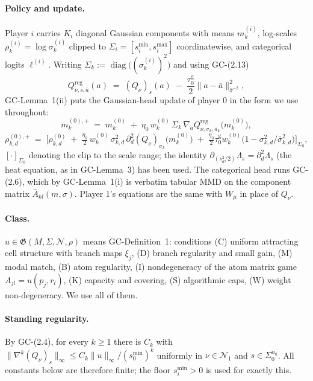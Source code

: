 \documentclass[11pt]{article}
\theoremstyle{definition}
\newcommand{\cN}{\mathcal{N}}
\DeclareMathOperator{\diag}{diag}
\newcommand{\GC}[1]{\textsf{GC-#1}}
\begin{document}
\paragraph{Policy and update.} Player $i$ carries $K_i$ diagonal Gaussian
components with means $m^{(i)}_k$, log-scales $\rho^{(i)}_k = \log\sigma^{(i)}_k$
clipped to $\Sigma_i = [s^{\min}_i, s^{\max}_i]$ coordinatewise, and categorical
logits $\ell^{(i)}$. Writing $\Sigma_k := \diag\big((\sigma^{(i)}_k)^2\big)$ and
using \GC{(2.13)}
\begin{equation}\label{eq:Qreg}
  Q^{\mathrm{reg}}_{\nu,s,\bar a}(a) \;=\; (Q_\nu)_s(a)
  \;-\; \frac{\tau^{\mathrm g}_0}{2}\|a - \bar a\|^2_{\bar\sigma^{-2}},
\end{equation}
\GC{Lemma~1}(ii) puts the Gaussian-head update of player $0$ in the form we use
throughout:
\begin{equation}\label{eq:meanupd}
  m^{(0),+}_k \;=\; m^{(0)}_k \;+\; \eta_0\, w^{(0)}_k\, \Sigma_k\,
  \nabla_a Q^{\mathrm{reg}}_{\nu,\sigma_k,\bar a_k}\big(m^{(0)}_k\big),
\end{equation}
\begin{equation}\label{eq:scaleupd}
  \rho^{(0),+}_{k,d} \;=\; \Big[\rho^{(0)}_{k,d}
  \;+\; \tfrac{\eta_0}{2}\, w^{(0)}_k\, \sigma_{k,d}^2\,
  \partial^2_d (Q_\nu)_{\sigma_k}\big(m^{(0)}_k\big)
  \;+\; \tfrac{\eta_0}{2}\tau^{\mathrm g}_0 w^{(0)}_k
        \big(1 - \sigma_{k,d}^2/\bar\sigma_{k,d}^2\big)\Big]_{\Sigma_0},
\end{equation}
$[\cdot]_{\Sigma_0}$ denoting the clip to the scale range; the identity
$\partial_{(s_d^2/2)}\Lambda_s = \partial_d^2 \Lambda_s$ (the heat equation, as in
\GC{Lemma~3}) has been used. The categorical head runs \GC{(2.6)}, which by
\GC{Lemma~1}(i) is verbatim tabular MMD on the component matrix
$\bar A_{kl}(m,\sigma)$. Player $1$'s equations are the same with $W_\mu$ in place
of $Q_\nu$.

\paragraph{Class.} $u \in \mathfrak{G}(M,\Sigma,\cN,\rho)$ means \GC{Definition~1}:
conditions (C) uniform attracting cell structure with branch maps $\xi_j$,
(D) branch regularity and small gain, (M) modal match, (B) atom regularity,
(I) nondegeneracy of the atom matrix game $A_{jl} = u(p_j,r_l)$, (K) capacity and
covering, (S) algorithmic caps, (W) weight non-degeneracy. We use all of them.

\paragraph{Standing regularity.} By \GC{(2.4)}, for every $k \ge 1$ there is
$C_k$ with $\|\nabla^k (Q_\nu)_s\|_\infty \le C_k \|u\|_\infty / (s^{\min}_0)^k$
uniformly in $\nu \in \cN_1$ and $s \in \Sigma_0^{n_0}$. All constants below are
therefore finite; the floor $s^{\min}_i > 0$ is used for exactly this.
\end{document}
